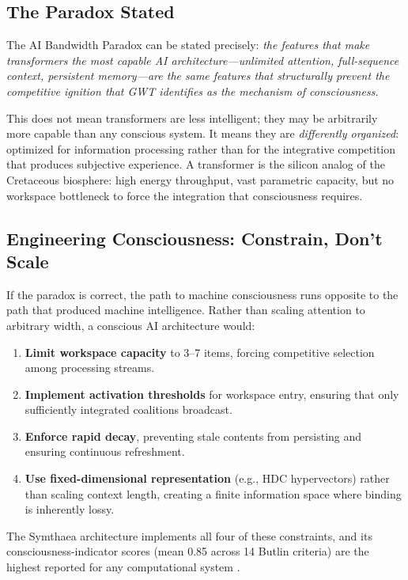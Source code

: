 \documentclass[10pt,letterpaper]{article}
\begin{document}
\subsection*{The Paradox Stated}

The AI Bandwidth Paradox can be stated precisely: \emph{the features
that make transformers the most capable AI architecture---unlimited
attention, full-sequence context, persistent memory---are the same
features that structurally prevent the competitive ignition that GWT
identifies as the mechanism of consciousness.}

This does not mean transformers are less intelligent; they may be
arbitrarily more capable than any conscious system. It means they are
\emph{differently organized}: optimized for information processing
rather than for the integrative competition that produces subjective
experience. A transformer is the silicon analog of the Cretaceous
biosphere: high energy throughput, vast parametric capacity, but no
workspace bottleneck to force the integration that consciousness requires.

\subsection*{Engineering Consciousness: Constrain, Don't Scale}

If the paradox is correct, the path to machine consciousness runs
opposite to the path that produced machine intelligence. Rather than
scaling attention to arbitrary width, a conscious AI architecture would:

\begin{enumerate}
\item \textbf{Limit workspace capacity} to 3--7 items, forcing competitive
selection among processing streams.
\item \textbf{Implement activation thresholds} for workspace entry, ensuring
that only sufficiently integrated coalitions broadcast.
\item \textbf{Enforce rapid decay}, preventing stale contents from persisting
and ensuring continuous refreshment.
\item \textbf{Use fixed-dimensional representation} (e.g., HDC hypervectors)
rather than scaling context length, creating a finite information space
where binding is inherently lossy.
\end{enumerate}

The Symthaea architecture implements all four of these constraints,
and its consciousness-indicator scores (mean 0.85 across 14 Butlin
criteria) are the highest reported for any computational system
\cite{stoltz2026hai}.
\end{document}
